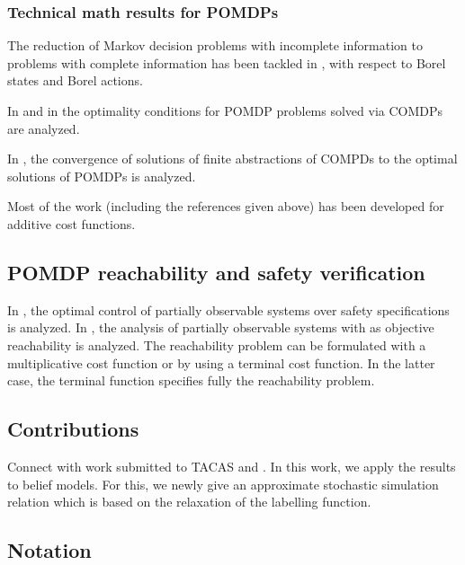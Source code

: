 \documentclass{ifacconf}
\newcommand{\red}[1]{{\color{red} #1}}
\begin{document}
\subsubsection{Technical math results for POMDPs}
The reduction of Markov decision problems with incomplete information to problems with complete information has been tackled in
\cite{yushkevich_reduction_1976,rhenius_incomplete_1974}, with respect to Borel states and Borel actions.

In \cite{feinberg2016partially} and in \cite{feinberg2014optimality} the optimality conditions for POMDP problems solved via COMDPs are analyzed. 

In \cite{saldi2017finite}, the convergence of solutions of finite abstractions of COMPDs to the optimal solutions of POMDPs is analyzed. 


Most of the work (including the references given above) has been developed for additive cost functions. 


\subsection{POMDP reachability and safety verification}


In \cite{ding2013optimal}, the optimal control of partially observable systems over safety specifications is analyzed. 
In \cite{LESSER20141989}, the analysis of partially observable systems with as objective reachability is analyzed. 
The reachability problem can be formulated with a multiplicative cost function or by using a terminal cost function. In the latter case, the terminal function specifies fully the reachability problem.

\subsection{Contributions}
\red{Connect with work submitted to TACAS \citep{tech_report_TACAS} and \citep{haesaert2017verification}.  }
In this work, we apply the results to belief models. For this,  we newly give an approximate stochastic simulation relation which is based on the relaxation of the labelling function.
\subsection{Notation}
\end{document}
